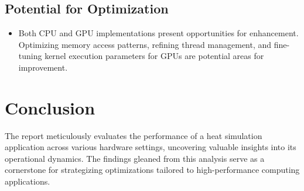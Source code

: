 \documentclass[11pt]{article}
\begin{document}
    \hypertarget{potential-for-optimization}{%
    \subsection{Potential for
    Optimization}\label{potential-for-optimization}}

    \begin{itemize}
    
    \item
    Both CPU and GPU implementations present opportunities for
    enhancement. Optimizing memory access patterns, refining thread
    management, and fine-tuning kernel execution parameters for GPUs are
    potential areas for improvement.
    \end{itemize}

    \hypertarget{conclusion}{%
    \section{Conclusion}\label{conclusion}}

    The report meticulously evaluates the performance of a heat simulation
    application across various hardware settings, uncovering valuable
    insights into its operational dynamics. The findings gleaned from this
    analysis serve as a cornerstone for strategizing optimizations tailored
    to high-performance computing applications.

    
\end{document}
